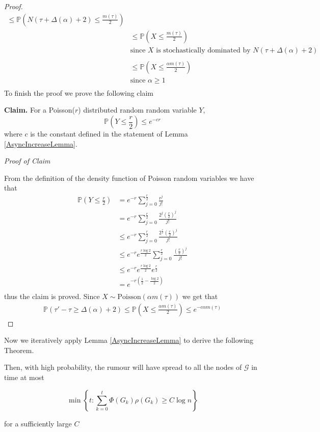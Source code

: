 \begin{proof}
\begin{align*}
		\leq \mathbb{P} (N(\tau + \Delta(\alpha) + 2) \leq \frac{m(\tau)}{2}) \\ %
		& \leq \mathbb{P}(X \leq \frac{m(\tau)}{2}) \\
		& \text{since } X \text{ is stochastically dominated by } N(\tau + \Delta(\alpha) + 2) \\
		& \\
		& \leq \mathbb{P}(X \leq \frac{\alpha m(\tau)}{2}) \\
		& \text{since } \alpha \geq 1 \\ %
	\end{align*}
	To finish the proof we prove the following claim

	\noindent
	\textbf{Claim.} For a Poisson($r$) distributed random random variable $Y$, 
	$$
		\mathbb{P}(Y \leq \frac{r}{2}) \leq e^{-cr}
	$$
	where $c$ is the constant defined in the statement of Lemma \ref{AsyncIncreaseLemma}.

	\noindent
	\textit{Proof of Claim}

	\noindent
	From the definition of the density function of Poisson random variables we have that 
	\begin{align*}
		\mathbb{P}(Y \leq \frac{r}{2}) & = e^{-r} \sum_{j=0}^\frac{r}{2} \frac{r^j}{j!} \\ %
		& = e^{-r} \sum_{j=0}^\frac{r}{2} \frac{2^j(\frac{r}{2})^j}{j!} \\
		& \leq e^{-r} \sum_{j=0}^\frac{r}{2} \frac{2^\frac{r}{2}(\frac{r}{2})^j}{j!} \\
		& \leq e^{-r} e^\frac{r \log 2}{2} \sum_{j=0}^\frac{r}{2} \frac{(\frac{r}{2})^j}{j!} \\
		& \leq e^{-r} e^\frac{r \log 2}{2} e^\frac{r}{2} \\
		& = e^{-r(\frac{1}{2} - \frac{\log2}{2})} \\ %
	\end{align*}
	thus the claim is proved. Since $X \sim \text{Poisson}(\alpha m(\tau))$ we get that
	\begin{align*}
		\mathbb{P}(\tau' - \tau \geq \Delta(\alpha) + 2) \leq \mathbb{P}(X \leq \frac{\alpha m(\tau)}{2}) \leq e^{-c \alpha m(\tau)}
	\end{align*}	
\end{proof}

Now we iteratively apply Lemma \ref{AsyncIncreaseLemma} to derive the following Theorem.

\begin{theorem}\label{theorem:AsyncUpperBound}
	\ModelIntro Then, with high probability, the rumour will have spread to all the nodes of $\mathcal{G}$ in time at most

	$$
		\min \left\{t : \sum_{k=0}^t \Phi(G_k)\rho(G_k) \geq C \log n \right\} 
	$$

	\noindent
	for a sufficiently large $C$
\end{theorem}

